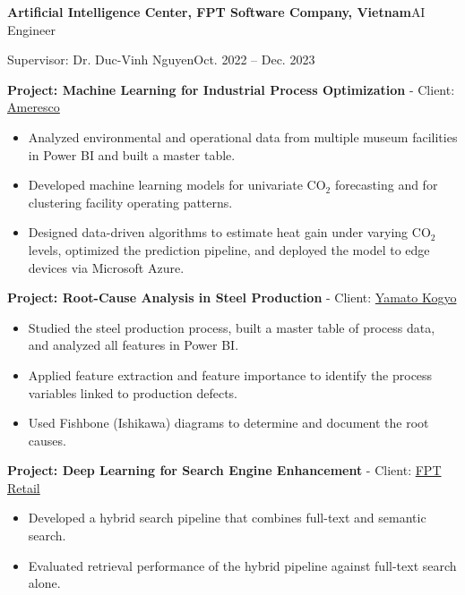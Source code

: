 \documentclass[a4paper,10pt]{extarticle}
\newcommand{\cventry}[2]{\noindent\textbf{#1}\hfill #2\par}
\newcommand{\cvline}[2]{\noindent #1\hfill #2\par}
\newenvironment{cvlist}{\begin{list}{}{%
  \setlength{\leftmargin}{0pt}\setlength{\itemindent}{0pt}%
  \setlength{\parsep}{0pt}\setlength{\itemsep}{4pt}\setlength{\topsep}{4pt}}}%
  {\end{list}}
\begin{document}
\begin{cvlist}
    \item
    \cventry{Artificial Intelligence Center, FPT Software Company, Vietnam}{AI Engineer}
    \cvline{Supervisor: Dr. Duc-Vinh Nguyen}{Oct. 2022 -- Dec. 2023}
    \begin{enumerate}[label={[\arabic*]}, leftmargin=*]
        \item \textbf{Project: Machine Learning for Industrial Process Optimization} - Client: \href{https://www.ameresco.com/}{Ameresco}
        \begin{itemize}[leftmargin=*]
            \item Analyzed environmental and operational data from multiple museum facilities in Power BI and built a master table.
            \item Developed machine learning models for univariate CO$_2$ forecasting and for clustering facility operating patterns.
            \item Designed data-driven algorithms to estimate heat gain under varying CO$_2$ levels, optimized the prediction pipeline, and deployed the model to edge devices via Microsoft Azure.
        \end{itemize}
        \item \textbf{Project: Root-Cause Analysis in Steel Production} - Client: \href{https://www.yamatokogyo.co.jp/steel/en/}{Yamato Kogyo}
        \begin{itemize}[leftmargin=*]
            \item Studied the steel production process, built a master table of process data, and analyzed all features in Power BI.
            \item Applied feature extraction and feature importance to identify the process variables linked to production defects.
            \item Used Fishbone (Ishikawa) diagrams to determine and document the root causes.
        \end{itemize}
        \item \textbf{Project: Deep Learning for Search Engine Enhancement} - Client: \href{https://nhathuoclongchau.com.vn/}{FPT Retail}
        \begin{itemize}[leftmargin=*]
            \item Developed a hybrid search pipeline that combines full-text and semantic search.
            \item Evaluated retrieval performance of the hybrid pipeline against full-text search alone.
        \end{itemize}
    \end{enumerate}


\end{cvlist}
\end{document}
